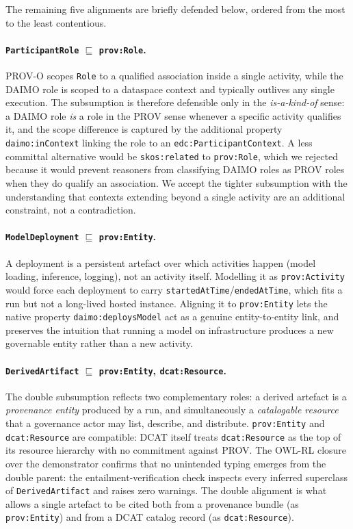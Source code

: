 \documentclass[Afour,sagev,times]{sagej}
\newcommand{\code}[1]{\texttt{#1}}
\begin{document}
The remaining five alignments are briefly defended below, ordered from the most to the least contentious.

\paragraph{\code{ParticipantRole} $\sqsubseteq$ \code{prov:Role}.} PROV-O scopes \code{Role} to a qualified association inside a single activity, while the DAIMO role is scoped to a dataspace context and typically outlives any single execution. The subsumption is therefore defensible only in the \emph{is-a-kind-of} sense: a DAIMO role \emph{is} a role in the PROV sense whenever a specific activity qualifies it, and the scope difference is captured by the additional property \code{daimo:inContext} linking the role to an \code{edc:ParticipantContext}. A less committal alternative would be \code{skos:related} to \code{prov:Role}, which we rejected because it would prevent reasoners from classifying DAIMO roles as PROV roles when they do qualify an association. We accept the tighter subsumption with the understanding that contexts extending beyond a single activity are an additional constraint, not a contradiction.

\paragraph{\code{ModelDeployment} $\sqsubseteq$ \code{prov:Entity}.} A deployment is a persistent artefact over which activities happen (model loading, inference, logging), not an activity itself. Modelling it as \code{prov:Activity} would force each deployment to carry \code{startedAtTime}/\code{endedAtTime}, which fits a run but not a long-lived hosted instance. Aligning it to \code{prov:Entity} lets the native property \code{daimo:deploysModel} act as a genuine entity-to-entity link, and preserves the intuition that running a model on infrastructure produces a new governable entity rather than a new activity.

\paragraph{\code{DerivedArtifact} $\sqsubseteq$ \code{prov:Entity}, \code{dcat:Resource}.} The double subsumption reflects two complementary roles: a derived artefact is a \emph{provenance entity} produced by a run, and simultaneously a \emph{catalogable resource} that a governance actor may list, describe, and distribute. \code{prov:Entity} and \code{dcat:Resource} are compatible: DCAT itself treats \code{dcat:Resource} as the top of its resource hierarchy with no commitment against PROV. The OWL-RL closure over the demonstrator confirms that no unintended typing emerges from the double parent: the entailment-verification check inspects every inferred superclass of \code{DerivedArtifact} and raises zero warnings. The double alignment is what allows a single artefact to be cited both from a provenance bundle (as \code{prov:Entity}) and from a DCAT catalog record (as \code{dcat:Resource}).
\end{document}

